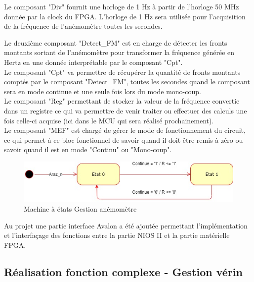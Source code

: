   Le composant "Div" fournit une horloge de 1 Hz à partir de l'horloge 50 MHz donnée par la clock du FPGA. L'horloge de 1 Hz sera utilisée pour l'acquisition de la fréquence de l'anémomètre toutes les secondes.

\newpage

  Le deuxième composant "Detect\_FM" est en charge de détecter les fronts montants sortant de l'anémomètre pour transformer la fréquence générée en Hertz en une donnée interprétable par le composant "Cpt".\\\newline
  Le composant "Cpt" va permettre de récupérer la quantité de fronts montants comptés par le composant "Detect\_FM", toutes les secondes quand le composant sera en mode continue et une seule fois lors du mode mono-coup.\\\newline
  Le composant "Reg" permettant de stocker la valeur de la fréquence convertie dans un registre ce qui va permettre de venir traiter ou effectuer des calculs une fois celle-ci acquise (ici dans le MCU qui sera réalisé prochainement).\\\newline
  Le composant "MEF" est chargé de gérer le mode de fonctionnement du circuit, ce qui permet à ce bloc fonctionnel de savoir quand il doit être remis à zéro ou savoir quand il est en mode "Continu" ou "Mono-coup".\vspace{1cm}
  \begin{figure}[h]
    \begin{center}
      \includegraphics[width=\textwidth]{images/MEF_anemo.jpg}
      \caption{Machine à états Gestion anémomètre}
    \end{center}
  \end{figure}

Au projet une partie interface Avalon a été ajoutée permettant l'implémentation et l'interfaçage des fonctions entre la partie NIOS II et la partie matérielle FPGA. 
  \newpage

  \subsection{Réalisation fonction complexe - Gestion vérin}

